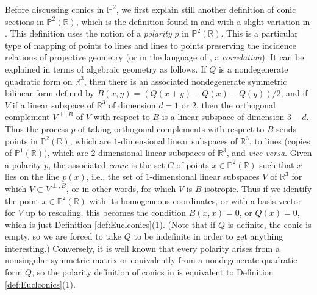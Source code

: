 \documentclass[12pt]{amsart}
\theoremstyle{definition}
\begin{document}
Before discussing conics in ${\mathbb H}^2$, we first explain still another
definition of conic sections in ${\mathbb P}^2({\mathbb R})$, which is the definition
found in \cite[Ch.\ III]{MR1628013} and with a slight variation in
\cite{MR1505334}. This definition uses the notion of a \emph{polarity}
$p$ in ${\mathbb P}^2({\mathbb R})$. This is a particular type of
mapping of points to lines and lines to
points preserving the incidence relations of
projective geometry (or in the language of \cite[\S3.1]{MR1628013}, a
\emph{correlation}).  It can be explained in 
terms of algebraic geometry as follows. If $Q$ is a nondegenerate
quadratic form on ${\mathbb R}^3$, then there is an associated nondegenerate
symmetric bilinear form defined by $B(x,y)= (Q(x+y)-Q(x)-Q(y))/2$, and
if $V$ if a linear subspace of ${\mathbb R}^3$ of dimension $d=1$ or $2$, then
the orthogonal complement $V^{\perp, B}$ of $V$ with respect to $B$ is a linear
subspace of dimension $3-d$.  Thus the process $p$ of taking orthogonal
complements with respect to $B$ sends points in ${\mathbb P}^2({\mathbb R})$, which
are $1$-dimensional linear subspaces of ${\mathbb R}^3$, to lines (copies of
${\mathbb P}^1({\mathbb R})$), which are $2$-dimensional linear subspaces of ${\mathbb R}^3$,
and \emph{vice versa}. Given a polarity $p$, the associated
\emph{conic} is the set $C$ of points $x\in {\mathbb P}^2({\mathbb R})$ such that $x$
lies on the line $p(x)$, i.e., the set of $1$-dimensional linear
subspaces $V$ of ${\mathbb R}^3$ for which $V\subset V^{\perp, B}$, or in
other words, for which $V$ is $B$-isotropic.  Thus if
we identify the point $x\in {\mathbb P}^2({\mathbb R})$ with its homogeneous
coordinates, or with a basis vector for $V$ up to rescaling, this
becomes the condition $B(x,x)=0$, or $Q(x)=0$, which is just
Definition \ref{def:Euclconics}(1).  (Note that if $Q$ is definite,
the conic is empty, so we are forced to take $Q$ to be indefinite in
order to get anything interesting.)  Conversely, it is well known 
\cite[\S4.72]{MR1628013} that
every polarity arises from a nonsingular symmetric matrix or
equivalently from a nondegenerate quadratic form $Q$, so the polarity
definition of conics in \cite[Ch.\ III]{MR1628013} is equivalent to 
Definition \ref{def:Euclconics}(1). 
\end{document}
